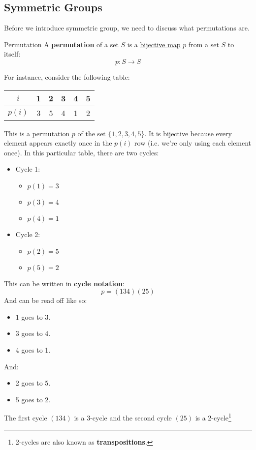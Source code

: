 \documentclass[letterpaper]{article}
\begin{document}
\subsection{Symmetric Groups}
Before we introduce symmetric group, we need to discuss what permutations are. 
\begin{definition}{Permutation}{}
    A \textbf{permutation} of a set $S$ is a \underline{bijective map} $p$ from a set $S$ to itself: 
    \[p: S \to S\]
\end{definition}
For instance, consider the following table: 
\begin{center}
    \begin{tabular}{|c|c c c c c|}
        \hline 
        $i$ & 1 & 2 & 3 & 4 & 5 \\ 
        \hline 
        $p(i)$ & 3 & 5 & 4 & 1 & 2 \\ 
        \hline 
    \end{tabular}
\end{center}
This is a permutation $p$ of the set $\{1, 2, 3, 4, 5\}$. It is bijective because every element appears exactly once in the $p(i)$ row (i.e. we're only using each element once). In this particular table, there are two cycles:
\begin{itemize}
    \item Cycle 1: 
    \begin{itemize}
        \item $p(1) = 3$
        \item $p(3) = 4$
        \item $p(4) = 1$
    \end{itemize}
    \item Cycle 2: 
    \begin{itemize}
        \item $p(2) = 5$
        \item $p(5) = 2$
    \end{itemize}
\end{itemize}
This can be written in \textbf{cycle notation}:
\[p = (1 3 4)(2 5)\]
And can be read off like so: 
\begin{itemize}
    \item 1 goes to 3. 
    \item 3 goes to 4. 
    \item 4 goes to 1.
\end{itemize}
And: 
\begin{itemize}
    \item 2 goes to 5. 
    \item 5 goes to 2.
\end{itemize}
The first cycle $(1 3 4)$ is a 3-cycle and the second cycle $(2 5)$ is a 2-cycle\footnote{2-cycles are also known as \textbf{transpositions}.}
\end{document}
